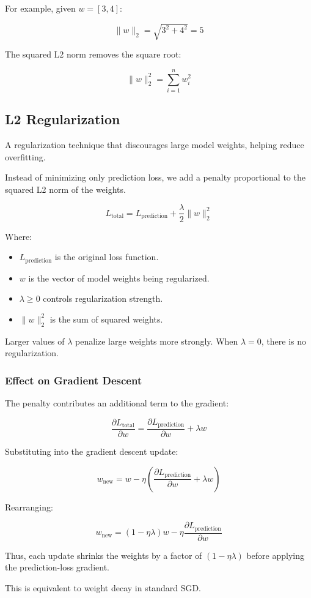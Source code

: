 \documentclass[12pt, letterpaper]{article}
\begin{document}
For example, given $w = [3,4]$:

\[
    \|w\|_2 = \sqrt{3^2 + 4^2} = 5
\]

The squared L2 norm removes the square root:

\[
    \|w\|_2^2 = \sum_{i=1}^{n} w_i^2
\]

\subsection{L2 Regularization}

A regularization technique that discourages large model weights,
helping reduce overfitting.

Instead of minimizing only prediction loss, we add a penalty
proportional to the squared L2 norm of the weights.

\[
    L_{\text{total}} =
    L_{\text{prediction}} +
    \frac{\lambda}{2}\|w\|_2^2
\]

Where:
\begin{itemize}
    \item $L_{\text{prediction}}$ is the original loss function.
    \item $w$ is the vector of model weights being regularized.
    \item $\lambda \geq 0$ controls regularization strength.
    \item $\|w\|_2^2$ is the sum of squared weights.
\end{itemize}

Larger values of $\lambda$ penalize large weights more strongly.
When $\lambda = 0$, there is no regularization.

\subsubsection*{Effect on Gradient Descent}

The penalty contributes an additional term to the gradient:

\[
    \frac{\partial L_{\text{total}}}{\partial w}
    =
    \frac{\partial L_{\text{prediction}}}{\partial w}
    + \lambda w
\]

Substituting into the gradient descent update:

\[
    w_{\text{new}} =
    w - \eta
    \left(
        \frac{\partial L_{\text{prediction}}}{\partial w}
        + \lambda w
    \right)
\]

Rearranging:

\[
    \boxed{
        w_{\text{new}} =
        (1-\eta\lambda)w -
        \eta\frac{\partial L_{\text{prediction}}}{\partial w}
    }
\]

Thus, each update shrinks the weights by a factor of
$(1-\eta\lambda)$ before applying the prediction-loss gradient.

This is equivalent to weight decay in standard SGD.
\end{document}
